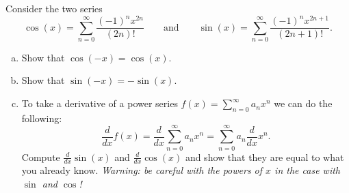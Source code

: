 \documentclass[12pt]{article} %
\begin{document}
\newpage
\begin{problem}
Consider the two series
\[
\cos(x) = \sum_{n=0}^\infty \frac{(-1)^n x^{2n}}{(2n)!} \qquad \textrm{and} \qquad \sin(x) = \sum_{n=0}^\infty \frac{(-1)^n x^{2n+1}}{(2n+1)!}.
\]
\begin{enumerate}[(a)]
    \item Show that $\cos(-x)=\cos(x)$.
    \item Show that $\sin(-x)=-\sin(x)$.
    \item To take a derivative of a power series $f(x) = \displaystyle{\sum_{n=0}^\infty a_n x^n}$ we can do the following: 
    \[
    \frac{d}{dx}f(x) = \frac{d}{dx} \sum_{n=0}^\infty a_n x^n = \sum_{n=0}^\infty a_n \frac{d}{dx} x^n.
    \]
    Compute $\frac{d}{dx} \sin(x)$ and $\frac{d}{dx} \cos(x)$ and show that they are equal to what you already know. \emph{Warning: be careful with the powers of $x$ in the case with $\sin$ and $\cos$!}
\end{enumerate}
\end{problem}
\end{document}
